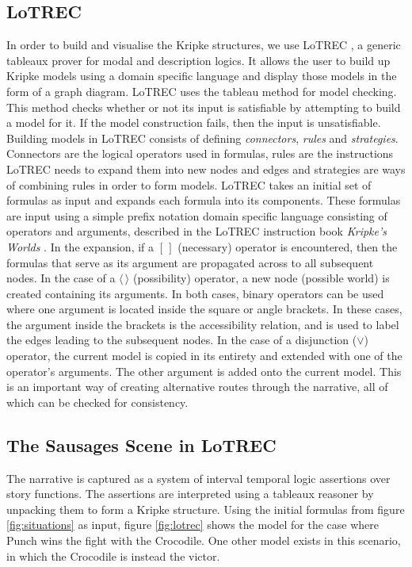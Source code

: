 \documentclass{llncs}
\begin{document}
\subsection{LoTREC}
In order to build and visualise the Kripke structures, we use LoTREC \cite{del2001lotrec}, a generic tableaux prover for modal and description logics. It allows the user to build up Kripke models using a domain specific language and display those models in the form of a graph diagram.
LoTREC uses the tableau method for model checking. This method checks whether or not its input is satisfiable by attempting to build a model for it. If the model construction fails, then the input is unsatisfiable.
Building models in LoTREC consists of defining \emph{connectors}, \emph{rules} and \emph{strategies}. Connectors are the logical operators used in formulas, rules are the instructions LoTREC needs to expand them into new nodes and edges and strategies are ways of combining rules in order to form models.
LoTREC takes an initial set of formulas as input and expands each formula into its components. These formulas are input using a simple prefix notation domain specific language consisting of operators and arguments, described in the LoTREC instruction book \emph{Kripke's Worlds} \cite{gasquet2013kripke}.
In the expansion, if a $[\,]$ (necessary) operator is encountered, then the formulas that serve as its argument are propagated across to all subsequent nodes. In the case of a $\langle \, \rangle$ (possibility) operator, a new node (possible world) is created containing its arguments. In both cases, binary operators can be used where one argument is located inside the square or angle brackets. In these cases, the argument inside the brackets is the accessibility relation, and is used to label the edges leading to the subsequent nodes.
In the case of a disjunction ($\lor$) operator, the current model is copied in its entirety and extended with one of the operator's arguments. The other argument is added onto the current model. This is an important way of creating alternative routes through the narrative, all of which can be checked for consistency.

\subsection{The Sausages Scene in LoTREC}
The narrative is captured as a system of interval temporal logic assertions over story functions. The  assertions are interpreted using a tableaux reasoner by unpacking them to form a Kripke structure.
Using the initial formulas from figure \ref{fig:situations} as input, figure \ref{fig:lotrec} shows the model for the case where Punch wins the fight with the Crocodile. One other model exists in this scenario, in which the Crocodile is instead the victor.
\end{document}
